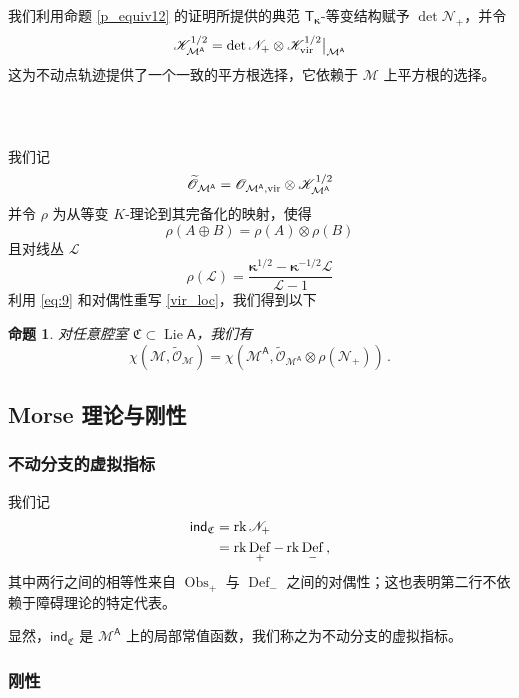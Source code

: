 \documentclass[12pt]{article}
\newcommand{\cO}{\mathscr{O}}
\newcommand{\cL}{\mathscr{L}}
\newcommand{\cN}{\mathscr{N}}
\newcommand{\Kvir}{\mathscr{K}_{\textup{vir}}}
\newcommand{\cM}{\mathcal{M}}
\newcommand{\fC}{\mathfrak{C}}
\DeclareMathOperator{\Lie}{Lie}
\DeclareMathOperator{\Def}{Def}
\DeclareMathOperator{\Obs}{Obs}
\DeclareMathOperator{\rk}{rk}
\newcommand{\sind}{\mathsf{ind}}
\newcommand{\tO}{\widetilde{\mathscr{O}}}
\newcommand{\bT}{\mathsf{T}}
\newcommand{\bA}{\mathsf{A}}
\newcommand{\cK}{\mathscr{K}}
\newcommand{\bk}{\boldsymbol{\kappa}}
\newtheorem{Proposition}[Lemma]{命题}
\theoremstyle{definition}
\begin{document}
我们利用命题 \ref{p_equiv12} 的证明所提供的典范 $\bT_{\bk}$-等变结构赋予 $\det \cN_+$，并令
\begin{equation}
\cK_{\cM^{\bA}}^{1/2} = \det \cN_+
\otimes \Kvir^{1/2} \big|_{\cM^{\bA}} \label{eq:9}
\end{equation}
这为不动点轨迹提供了一个一致的平方根选择，它依赖于 $\cM$ 上平方根的选择。

\subsubsection{\ }

我们记
$$
\tO_{\cM^{\bA}} = \cO_{\cM^{\bA},\textup{vir}} \otimes
\cK_{\cM^{\bA}}^{1/2}
$$
并令 $\rho$ 为从等变 $K$-理论到其完备化的映射，使得
$$
\rho(A\oplus B) = \rho(A) \otimes \rho(B)
$$
且对线丛 $\cL$
$$
\rho(\cL) = \frac{\bk^{1/2}-\bk^{-1/2} \cL}{\cL-1}
$$
利用 \eqref{eq:9} 和对偶性重写 \eqref{vir_loc}，我们得到以下

\begin{Proposition}\label{p_rho}
对任意腔室 $\fC\subset \Lie \bA$，我们有
\begin{equation}
\chi(\cM,\tO_{\cM}) = \chi\left(\cM^{\bA}, \tO_{\cM^{\bA}}
\otimes \rho(\cN_{+}) \right) \,.
\label{vir_loc2}
\end{equation}
\end{Proposition}

\subsection{Morse 理论与刚性}

\subsubsection{不动分支的虚拟指标}

我们记
\begin{align}
  \sind_{\fC} &=
\rk \cN_+\notag \\
&= \rk \Def_+ - \rk \Def_- \label{sind} \,,
\end{align}
其中两行之间的相等性来自 $\Obs_+$ 与 $\Def_-$ 之间的对偶性；这也表明第二行不依赖于障碍理论的特定代表。

显然，$\sind_{\fC}$ 是 $\cM^{\bA}$ 上的局部常值函数，我们称之为不动分支的虚拟指标。

\subsubsection{刚性}\label{s_rig}
\end{document}

